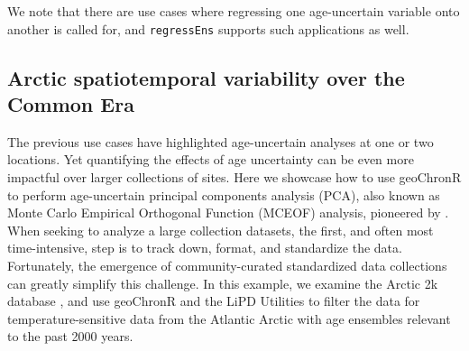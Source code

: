 \documentclass[gchron, manuscript]{copernicus}
\begin{document}
We note that there are use cases where regressing one age-uncertain
variable onto another is called for, and \texttt{regressEns} supports
such applications as well.

\hypertarget{sec:pca}{%
\subsection{Arctic spatiotemporal variability over the Common
Era}\label{sec:pca}}

The previous use cases have highlighted age-uncertain analyses at one or
two locations. Yet quantifying the effects of age uncertainty can be
even more impactful over larger collections of sites. Here we showcase
how to use geoChronR to perform age-uncertain principal components
analysis (PCA), also known as Monte Carlo Empirical Orthogonal Function
(MCEOF) analysis, pioneered by \citet{anchukaitis2013mceof}. When
seeking to analyze a large collection datasets, the first, and often
most time-intensive, step is to track down, format, and standardize the
data. Fortunately, the emergence of community-curated standardized data
collections
\citep[e.g.][]{PAGES2K_ngeo2013_short, pages2k2017, kaufman2020temp12k, konecky2020iso2k}
can greatly simplify this challenge. In this example, we examine the
Arctic 2k database \citep{McKayKaufman2014}, and use geoChronR and the
LiPD Utilities to filter the data for temperature-sensitive data from
the Atlantic Arctic with age ensembles relevant to the past 2000 years.
\end{document}
